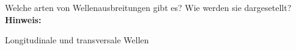 \begin{question}[section=5,subsection=52,name={Wellenausbreitungsphänomene},difficulty=6,type=mdl,tags={}]
	Welche arten von Wellenausbreitungen gibt es? Wie werden sie dargesetellt?
	\\ \textbf{Hinweis:}\\
	
\end{question}
\begin{solution}
	Longitudinale und transversale Wellen
\end{solution}